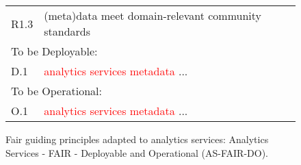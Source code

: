 \begin{figure}[htb]
{{\begin{tabular}{p{1cm}p{8cm}}
R1.3 & (meta)data meet domain-relevant community standards \\
\multicolumn{2}{l}{To be Deployable:}\\
D.1 & \textcolor{red}{analytics services metadata} ... \\
\multicolumn{2}{l}{To be Operational:} \\ 
O.1 & \textcolor{red}{analytics services metadata} ... \\ 
\end{tabular}
}
}
\caption{Fair guiding principles adapted to analytics services:
  Analytics Services - FAIR - Deployable and Operational
  (AS-FAIR-DO).}\label{fig:as-fair-do}
\end{figure}

\clearpage
